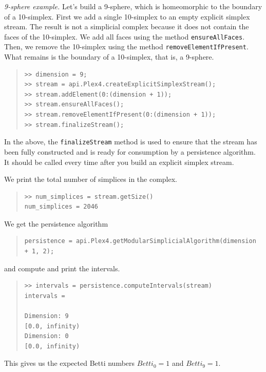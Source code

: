 \documentclass[amscd, amssymb, verbatim]{amsart}[12pt]
\theoremstyle{remark}
\theoremstyle{remark}
\theoremstyle{remark}
\begin{document}
{\em 9-sphere example.} Let's build a 9-sphere, which is homeomorphic to the boundary of a 10-simplex. First we add a single 10-simplex to an empty explicit simplex stream. The result is not a simplicial complex because it does not contain the faces of the 10-simplex. We add all faces using the method \texttt{ensureAllFaces}. Then, we remove the 10-simplex using the method \texttt{removeElementIfPresent}. What remains is the boundary of a 10-simplex, that is, a 9-sphere.

\begin{quote} \begin{verbatim}
>> dimension = 9;
>> stream = api.Plex4.createExplicitSimplexStream();
>> stream.addElement(0:(dimension + 1));
>> stream.ensureAllFaces();
>> stream.removeElementIfPresent(0:(dimension + 1));
>> stream.finalizeStream();
\end{verbatim} \end{quote}

In the above, the \texttt{finalizeStream} method is used to ensure that the stream has been fully constructed and is ready for consumption by a persistence algorithm. It should be called every time after you build an explicit simplex stream. 

We print the total number of simplices in the complex.

\begin{quote} \begin{verbatim}
>> num_simplices = stream.getSize()
num_simplices = 2046
\end{verbatim} \end{quote}

We get the persistence algorithm

\begin{quote} \begin{verbatim}
persistence = api.Plex4.getModularSimplicialAlgorithm(dimension + 1, 2);
\end{verbatim} \end{quote}

and compute and print the intervals.

\begin{quote} \begin{verbatim}
>> intervals = persistence.computeIntervals(stream)
intervals =

Dimension: 9
[0.0, infinity)
Dimension: 0
[0.0, infinity)
\end{verbatim} \end{quote}

This gives us the expected Betti numbers $Betti_0=1$ and $Betti_9=1$.
\end{document}
